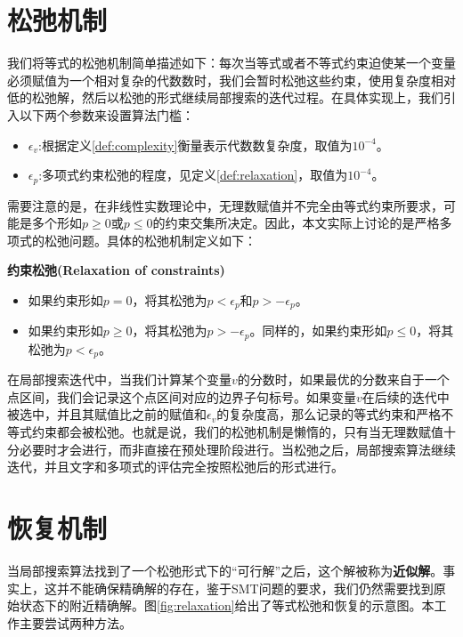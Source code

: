 \section{松弛机制}
我们将等式的松弛机制简单描述如下：每次当等式或者不等式约束迫使某一个变量必须赋值为一个相对复杂的代数数时，我们会暂时松弛这些约束，使用复杂度相对低的松弛解，然后以松弛的形式继续局部搜索的迭代过程。在具体实现上，我们引入以下两个参数来设置算法门槛：
\begin{itemize}
    \item $\epsilon_v$:根据定义\ref{def:complexity}衡量表示代数数复杂度，取值为$10^{-4}$。
    \item $\epsilon_p$:多项式约束松弛的程度，见定义\ref{def:relaxation}，取值为$10^{-4}$。
\end{itemize}


需要注意的是，在非线性实数理论中，无理数赋值并不完全由等式约束所要求，可能是多个形如$p \ge 0$或$p \le 0$的约束交集所决定。因此，本文实际上讨论的是严格多项式的松弛问题。具体的松弛机制定义如下：

\begin{definition}{\textbf{约束松弛(Relaxation of constraints)}}
\label{def:relaxation}
\begin{itemize}
    \item 如果约束形如$p = 0$，将其松弛为$p < \epsilon_p$和$p > -\epsilon_p$。
    \item 如果约束形如$p \ge 0$，将其松弛为$p > -\epsilon_p$。同样的，如果约束形如$p \le 0$，将其松弛为$p < \epsilon_p$。
\end{itemize}
\end{definition}

在局部搜索迭代中，当我们计算某个变量$v$的分数时，如果最优的分数来自于一个点区间，我们会记录这个点区间对应的边界子句标号。如果变量$v$在后续的迭代中被选中，并且其赋值比之前的赋值和$\epsilon_v$的复杂度高，那么记录的等式约束和严格不等式约束都会被松弛。也就是说，我们的松弛机制是懒惰的，只有当无理数赋值十分必要时才会进行，而非直接在预处理阶段进行。当松弛之后，局部搜索算法继续迭代，并且文字和多项式的评估完全按照松弛后的形式进行。


\section{恢复机制}
当局部搜索算法找到了一个松弛形式下的“可行解”之后，这个解被称为\textbf{近似解}。事实上，这并不能确保精确解的存在，鉴于SMT问题的要求，我们仍然需要找到原始状态下的附近精确解。图\ref{fig:relaxation}给出了等式松弛和恢复的示意图。本工作主要尝试两种方法。

